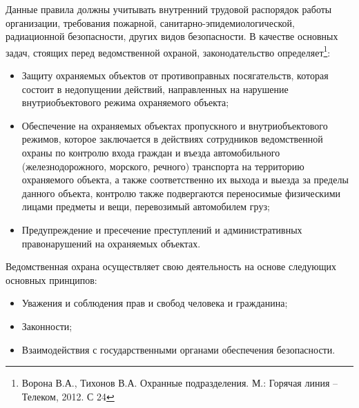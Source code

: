 \documentclass[a4paper,12pt,fleqn]{article} %
\begin{document}

Данные правила должны учитывать внутренний трудовой распорядок работы организации, требования пожарной, санитарно-эпидемиологической, радиационной безопасности, других видов безопасности. В качестве основных задач, стоящих перед ведомственной охраной, законодательство определяет\footnote{Ворона В.А., Тихонов В.А. Охранные подразделения. М.: Горячая линия – Телеком, 2012. С 24}:

\begin{itemize}
	\item Защиту охраняемых объектов от противоправных посягательств, которая состоит в недопущении действий, направленных на нарушение внутриобъектового режима охраняемого объекта;
	\item Обеспечение на охраняемых объектах пропускного и внутриобъектового режимов, которое заключается в действиях сотрудников ведомственной охраны по контролю входа граждан и въезда автомобильного (железнодорожного, морского, речного) транспорта на территорию охраняемого объекта, а также соответственно их выхода и выезда за пределы данного объекта, контролю также подвергаются переносимые физическими лицами предметы и вещи, перевозимый автомобилем груз;
	\item Предупреждение и пресечение преступлений и административных правонарушений на охраняемых объектах.
\end{itemize}

Ведомственная охрана осуществляет свою деятельность на основе следующих основных принципов: 

\begin{itemize}
	\item Уважения и соблюдения прав и свобод человека и гражданина;
	\item Законности; 
	\item Взаимодействия с государственными органами обеспечения безопасности. 
\end{itemize}
\end{document}
